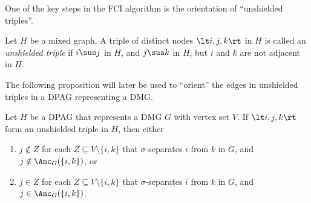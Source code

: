 One of the key steps in the FCI algorithm is the orientation of ``unshielded triples''.
\begin{Def}\label{def:unshielded_triple}
  Let $H$ be a mixed graph. A triple of distinct nodes $\lt i,j,k \rt$ in $H$ is called
  an \emph{unshielded triple} if $i \sus j$ in $H$, and $j \sus k$ in $H$, but
  $i$ and $k$ are not adjacent in $H$.
\end{Def}
The following proposition will later be used to ``orient'' the edges in unshielded triples
in a DPAG representing a DMG.

\begin{Prp}\label{prp:orienting_unshielded_triples}
  Let $H$ be a DPAG that represents a DMG $G$ with vertex set $V$.
  If $\lt i, j, k \rt$ form an unshielded triple in $H$, then
  either 
  \begin{enumerate}[label=(\roman*)]
    \item $j \notin Z$ for each $Z \subseteq V \setminus \{i,k\}$ that $\sigma$-separates $i$ from $k$ in $G$, and $j \notin \Anc_G(\{i,k\})$, or
    \item $j \in Z$ for each $Z \subseteq V \setminus \{i,k\}$ that $\sigma$-separates $i$ from $k$ in $G$, and $j \in \Anc_G(\{i,k\})$.
  \end{enumerate}
\end{Prp}
